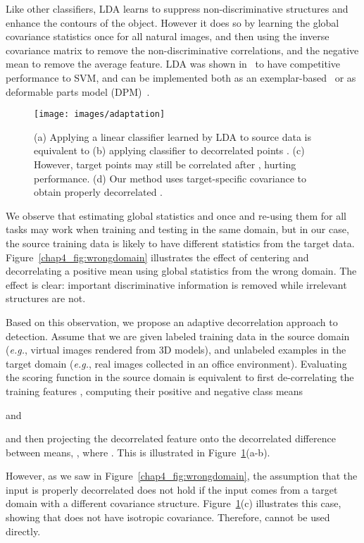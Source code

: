 \documentclass[graybox]{svmult}
\newcommand\eg{\emph{e.g.}}
\begin{document}
Like other classifiers, LDA learns to suppress non-discriminative structures and enhance the contours of the object. However it does so by learning the global covariance statistics once for all natural images, and then using the inverse covariance matrix to remove the non-discriminative correlations, and the negative mean to remove the average feature. LDA was shown in~\cite{who} to have competitive performance to SVM, and can be implemented both as an exemplar-based~\cite{exemplarsvm} or as deformable parts model (DPM)~\cite{dpm}.

\begin{figure}[t]
\centering
\texttt{[image: images/adaptation]}
\caption{\small (a) Applying a linear classifier  learned by LDA to source data   is equivalent to (b) applying classifier  to decorrelated points . (c) However, target points  may still be correlated after , hurting performance. (d) Our method uses target-specific covariance to obtain properly decorrelated . }
\label{chap4_fig:adapt}
\end{figure}

We observe that estimating global statistics   and  once and re-using them for all tasks may work when training and testing in the same domain, but in our case, the source training data is likely to have different statistics from the target data. Figure~\ref{chap4_fig:wrongdomain} illustrates the effect of centering and decorrelating a positive mean using global statistics from the wrong domain. The effect is clear: important discriminative information is removed while irrelevant structures are not. 

Based on this observation, we propose an adaptive decorrelation approach to detection. Assume that we are given labeled training data  in the source domain (\eg, virtual images rendered from 3D models), and unlabeled examples  in the target domain (\eg, real images collected in an office environment). Evaluating the scoring function  in the source domain is equivalent to first de-correlating the training features 
, 
computing their positive and negative class means 
 
and 
 
and then projecting the decorrelated feature onto the decorrelated difference between means, , where .
This is illustrated in Figure~\ref{chap4_fig:adapt}(a-b).

However, as we saw in Figure~\ref{chap4_fig:wrongdomain}, the assumption that the input is properly decorrelated does not hold if the input comes from a target domain with a different covariance structure. Figure~\ref{chap4_fig:adapt}(c) illustrates this case, showing that  does not have isotropic covariance. Therefore,  cannot be used directly. 
\end{document}
